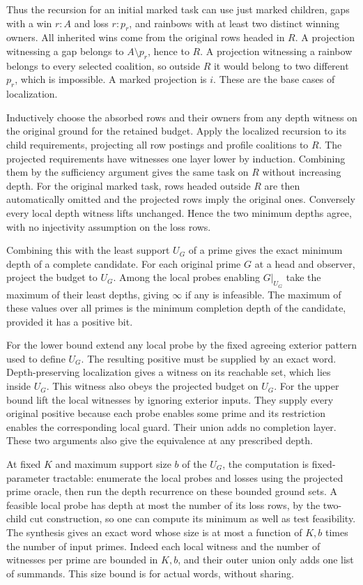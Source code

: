 Thus the recursion for an initial marked task
can use just marked children, gaps with a win
$r:A$ and loss $r:p_r$, and rainbows with at least
two distinct winning owners. All inherited wins
come from the original rows headed in $R$. A
projection witnessing a gap belongs to $A\setminus
p_r$, hence to $R$. A projection witnessing a
rainbow belongs to every selected coalition, so
outside $R$ it would belong to two different
$p_r$, which is impossible. A marked projection
is $i$. These are the base cases of localization.

Inductively choose the absorbed rows and their
owners from any depth witness on the original
ground for the retained budget. Apply the
localized recursion to its child requirements,
projecting all row postings and profile coalitions
to $R$. The projected requirements have witnesses
one layer lower by induction. Combining them by
the sufficiency argument gives the same task on
$R$ without increasing depth. For the original
marked task, rows headed outside $R$ are then
automatically omitted and the projected rows
imply the original ones. Conversely every local
depth witness lifts unchanged. Hence the two
minimum depths agree, with no injectivity
assumption on the loss rows.

Combining this with the least support $U_G$ of a
prime gives the exact minimum depth of a complete
candidate. For each original prime $G$ at a head
and observer, project the budget to $U_G$. Among
the local probes enabling $G|_{U_G}$ take the
maximum of their least depths, giving $\infty$
if any is infeasible. The maximum of these values
over all primes is the minimum completion depth
of the candidate, provided it has a positive bit.

For the lower bound extend any local probe by
the fixed agreeing exterior pattern used to
define $U_G$. The resulting positive must be
supplied by an exact word. Depth-preserving
localization gives a witness on its reachable
set, which lies inside $U_G$. This witness
also obeys the projected budget on $U_G$.
For the upper bound lift the local witnesses
by ignoring exterior inputs. They supply every
original positive because each probe enables
some prime and its restriction enables the
corresponding local guard. Their union adds
no completion layer. These two arguments also
give the equivalence at any prescribed depth.

At fixed $K$ and maximum support size $b$ of
the $U_G$, the computation is fixed-parameter
tractable: enumerate the local probes and losses
using the projected prime oracle, then run the
depth recurrence on these bounded ground sets.
A feasible local probe has depth at most the
number of its loss rows, by the two-child cut
construction, so one can compute its minimum
as well as test feasibility. The synthesis
gives an exact word whose size is at most a
function of $K,b$ times the number of input
primes. Indeed each local witness and the
number of witnesses per prime are bounded
in $K,b$, and their outer union only adds
one list of summands. This size bound is
for actual words, without sharing.

